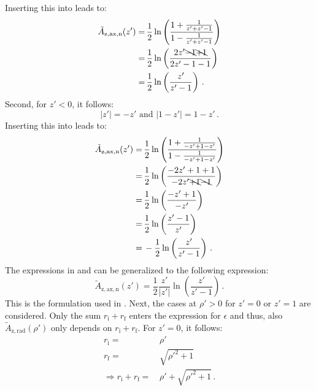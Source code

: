 Inserting this into  leads to:
\begin{align}
  \tilde{A}_\mathrm{z,ax,n} (z')
  =&\, \frac{1}{2} \ln \left( \frac{ 1 + \frac{1}{z' + z' - 1} }{ 1 - \frac{1}{z' + z' - 1}  } \right) \nonumber \\
  =&\, \frac{1}{2} \ln \left( \frac{ 2 z' \bcancel{-1} \bcancel{+1} }{2 z' -1 -1} \right) \nonumber \\
  =&\, \frac{1}{2} \ln \left( \frac{z'}{z' - 1} \right) \label{eqn:sws_A_z_ax_n_pos} \, .
\end{align}
Second, for $z' < 0$, it follows:
\begin{equation}
  |z'| = -z' \textrm{ and } |1 - z'| = 1 - z' \, .
\end{equation}
Inserting this into  leads to:
\begin{align}
  \tilde{A}_\mathrm{z,ax,n} (z')
  =&\, \frac{1}{2} \ln \left( \frac{ 1 + \frac{1}{-z' + 1 - z'} }{ 1 - \frac{1}{-z' + 1 - z'}  } \right) \nonumber \\
  =&\, \frac{1}{2} \ln \left( \frac{ -2 z' +1 +1 }{-2 z' \bcancel{+1} \bcancel{-1} } \right) \nonumber \\
  =&\, \frac{1}{2} \ln \left( \frac{-z' + 1}{-z'} \right) \nonumber \\
  =&\, \frac{1}{2} \ln \left( \frac{z' - 1}{z'} \right) \nonumber \\
  =&\, -\frac{1}{2} \ln \left( \frac{z'}{z' - 1} \right) \label{eqn:sws_A_z_ax_n_neg} \, .
\end{align}
The expressions in  and  can be generalized to the following expression:
\begin{equation}
  \tilde{A}_\mathrm{z,ax,n} (z') = \frac{1}{2} \frac{z'}{|z'|} \ln \left( \frac{z'}{z' - 1} \right) \label{eqn:sws_A_z_ax_n_derivation} \, .
\end{equation}
This is the formulation used in .
Next, the cases at $\rho' > 0$ for $z' = 0$ or $z' = 1$ are considered.
Only the sum $r_\mathrm{i} + r_\mathrm{f}$ enters the expression for $\epsilon$
and thus, also $\tilde{A}_\mathrm{z,rad}(\rho')$ only depends on $r_\mathrm{i} + r_\mathrm{f}$.
For $z' = 0$, it follows:
\begin{align}
  r_\mathrm{i} =&\, \rho' \\
  r_\mathrm{f} =&\, \sqrt{{\rho'}^2 + 1} \\
  \Rightarrow
  r_\mathrm{i} + r_\mathrm{f} =&\, \rho' + \sqrt{{\rho'}^2 + 1} \, .
\end{align}
